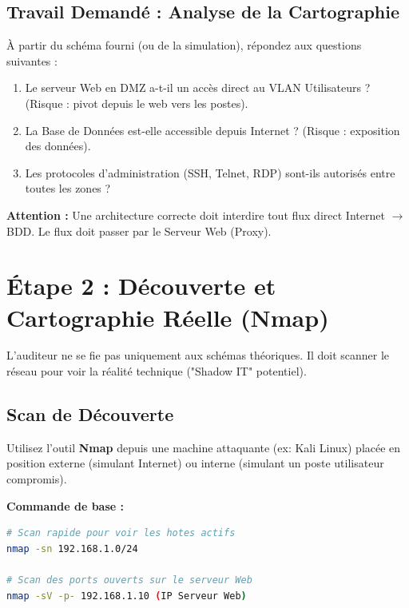 \subsection{Travail Demandé : Analyse de la Cartographie}

À partir du schéma fourni (ou de la simulation), répondez aux questions suivantes :
\begin{enumerate}
    \item Le serveur Web en DMZ a-t-il un accès direct au VLAN Utilisateurs ? (Risque : pivot depuis le web vers les postes).
    \item La Base de Données est-elle accessible depuis Internet ? (Risque : exposition des données).
    \item Les protocoles d'administration (SSH, Telnet, RDP) sont-ils autorisés entre toutes les zones ?
\end{enumerate}

\begin{boxalert}
\textbf{Attention :} Une architecture correcte doit interdire tout flux direct Internet $\rightarrow$ BDD. Le flux doit passer par le Serveur Web (Proxy).
\end{boxalert}

\section{Étape 2 : Découverte et Cartographie Réelle (Nmap)}

L'auditeur ne se fie pas uniquement aux schémas théoriques. Il doit scanner le réseau pour voir la réalité technique ("Shadow IT" potentiel).

\subsection{Scan de Découverte}

Utilisez l'outil \textbf{Nmap} depuis une machine attaquante (ex: Kali Linux) placée en position externe (simulant Internet) ou interne (simulant un poste utilisateur compromis).

\textbf{Commande de base :}
\begin{lstlisting}[language=bash, caption=Scan réseau Nmap]
# Scan rapide pour voir les hotes actifs
nmap -sn 192.168.1.0/24

# Scan des ports ouverts sur le serveur Web
nmap -sV -p- 192.168.1.10 (IP Serveur Web)
\end{lstlisting}

